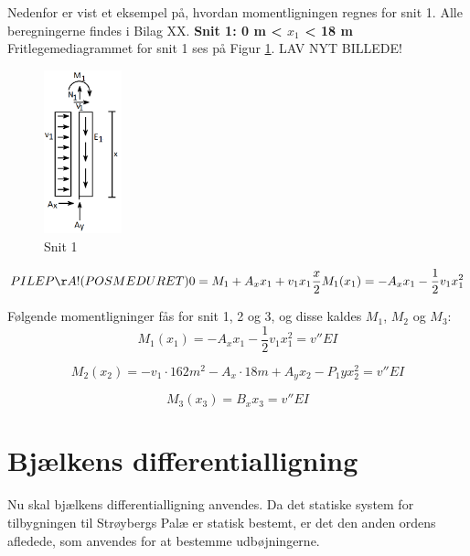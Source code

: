 Nedenfor er vist et eksempel på, hvordan momentligningen regnes for snit 1. Alle beregningerne findes i Bilag XX.
\newline
\newline
\textbf{Snit 1: 0 m < $x_1$ < 18 m}
\newline
Fritlegemediagrammet for snit 1 ses på Figur \ref{fig:snitetan}. LAV NYT BILLEDE!
\begin{figure}[H]
	\centering
	\includegraphics[width=0.2\textwidth]{billeder/asnitet.png}
	\caption{Snit 1}
	\label{fig:snitetan}
\end{figure}

\begin{equation}
PILE PÅ! (POS MED URET)  0 = M_1 + A_xx_1 + v_1x_1 \frac{x}{2}
\\
M_1(x_1)= {-A_x x_1-\frac{1}{2}v_1x_1^2}
\end{equation}

Følgende momentligninger fås for snit 1, 2 og 3, og disse kaldes $M_1$, $M_2$ og $M_3$:
\begin{equation}
	M_1(x_1)= -A_xx_1-\frac{1}{2}v_1x_1^2 = v''EI
\end{equation}

\begin{equation}
	M_2(x_2)= -v_1 \cdot 162m^2 - A_x \cdot 18m + A_yx_2 - P_1y x_2^2 = v''EI
\end{equation}

\begin{equation}
	M_3(x_3)= B_xx_3 = v''EI
\end{equation}

\section{Bjælkens differentialligning}
Nu skal bjælkens differentialligning anvendes. Da det statiske system for tilbygningen til Strøybergs Palæ er statisk bestemt, er det den anden ordens afledede, som anvendes for at bestemme udbøjningerne.

